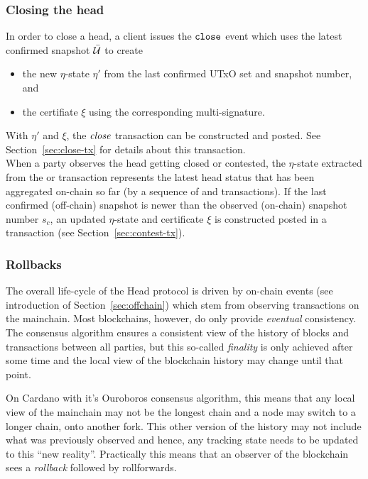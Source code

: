 \subsubsection{Closing the head}

\quad In order to close a head, a client issues the
$\mathtt{close}$ event which uses the latest confirmed snapshot $\bar {\mathcal U}$ to create
\begin{itemize}
	\item the new $\eta$-state $\eta'$ from the last confirmed UTxO set and snapshot
	      number, and
	\item the certifiate $\xi$ using the corresponding multi-signature.
\end{itemize}
With $\eta'$ and $\xi$, the $\textit{close}$ transaction can be constructed and
posted. See Section~\ref{sec:close-tx} for details about this transaction. \\

\quad When a party observes
the head getting closed or contested, the $\eta$-state extracted from the
\mtxClose{} or \mtxContest{} transaction represents the latest head status that
has been aggregated on-chain so far (by a sequence of \mtxClose{} and
\mtxContest{} transactions). If the last confirmed (off-chain) snapshot is newer
than the observed (on-chain) snapshot number $s_{c}$, an updated $\eta$-state
and certificate $\xi$ is constructed posted in a \mtxContest{} transaction (see
Section~\ref{sec:contest-tx}).

\subsubsection{Rollbacks}\label{sec:rollbacks}

The overall life-cycle of the Head protocol is driven by on-chain events (see
introduction of Section~\ref{sec:offchain}) which stem from observing
transactions on the mainchain. Most blockchains, however, do only provide
\emph{eventual} consistency. The consensus algorithm ensures a consistent view
of the history of blocks and transactions between all parties, but this
so-called \emph{finality} is only achieved after some time and the local view of
the blockchain history may change until that point.

On Cardano with it's Ouroboros consensus algorithm, this means that any local
view of the mainchain may not be the longest chain and a node may switch to a
longer chain, onto another fork. This other version of the history may not
include what was previously observed and hence, any tracking state needs to be
updated to this ``new reality''. Practically this means that an observer of the
blockchain sees a \emph{rollback} followed by rollforwards.


